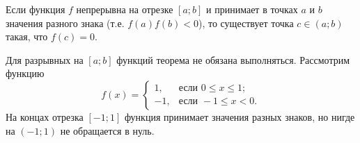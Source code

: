 
\begin{thm} \label{th3:13}
Если функция $f$ непрерывна на отрезке $[a; b]$ и принимает в точках $a$ и $b$ значения разного знака (т.е. $f(a)f(b) < 0$), то существует точка $c \in (a; b)$ такая, что $f(c) = 0$.
\end{thm}


\begin{exmpl} \label{exmpl:19}
    Для разрывных на $[a; b]$ функций теорема не обязана выполняться. Рассмотрим функцию
$$
f(x) = 
\begin{cases} 
1, & \text{если } 0 \le x \le 1; \\ 
-1, & \text{если } -1 \le x < 0. 
\end{cases}
$$
На концах отрезка $[-1; 1]$ функция принимает значения разных знаков, но нигде на $(-1; 1)$ не обращается в нуль.

\end{exmpl}